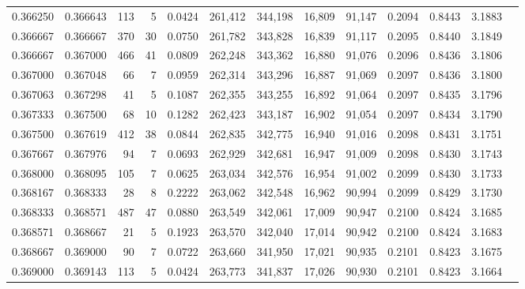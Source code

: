 \begin{tabular}{rrrrrrrrrrrrr}
0.366250 & 0.366643 &   113 &   5 &                                     0.0424 & 261,412 & 344,198 &  16,809 &  91,147 & 0.2094 & 0.8443 & 3.1883 \\
0.366667 & 0.366667 &   370 &  30 &                                     0.0750 & 261,782 & 343,828 &  16,839 &  91,117 & 0.2095 & 0.8440 & 3.1849 \\
0.366667 & 0.367000 &   466 &  41 &                                     0.0809 & 262,248 & 343,362 &  16,880 &  91,076 & 0.2096 & 0.8436 & 3.1806 \\
0.367000 & 0.367048 &    66 &   7 &                                     0.0959 & 262,314 & 343,296 &  16,887 &  91,069 & 0.2097 & 0.8436 & 3.1800 \\
0.367063 & 0.367298 &    41 &   5 &                                     0.1087 & 262,355 & 343,255 &  16,892 &  91,064 & 0.2097 & 0.8435 & 3.1796 \\
0.367333 & 0.367500 &    68 &  10 &                                     0.1282 & 262,423 & 343,187 &  16,902 &  91,054 & 0.2097 & 0.8434 & 3.1790 \\
0.367500 & 0.367619 &   412 &  38 &                                     0.0844 & 262,835 & 342,775 &  16,940 &  91,016 & 0.2098 & 0.8431 & 3.1751 \\
0.367667 & 0.367976 &    94 &   7 &                                     0.0693 & 262,929 & 342,681 &  16,947 &  91,009 & 0.2098 & 0.8430 & 3.1743 \\
0.368000 & 0.368095 &   105 &   7 &                                     0.0625 & 263,034 & 342,576 &  16,954 &  91,002 & 0.2099 & 0.8430 & 3.1733 \\
0.368167 & 0.368333 &    28 &   8 &                                     0.2222 & 263,062 & 342,548 &  16,962 &  90,994 & 0.2099 & 0.8429 & 3.1730 \\
0.368333 & 0.368571 &   487 &  47 &                                     0.0880 & 263,549 & 342,061 &  17,009 &  90,947 & 0.2100 & 0.8424 & 3.1685 \\
0.368571 & 0.368667 &    21 &   5 &                                     0.1923 & 263,570 & 342,040 &  17,014 &  90,942 & 0.2100 & 0.8424 & 3.1683 \\
0.368667 & 0.369000 &    90 &   7 &                                     0.0722 & 263,660 & 341,950 &  17,021 &  90,935 & 0.2101 & 0.8423 & 3.1675 \\
0.369000 & 0.369143 &   113 &   5 &                                     0.0424 & 263,773 & 341,837 &  17,026 &  90,930 & 0.2101 & 0.8423 & 3.1664 \\

\end{tabular}

